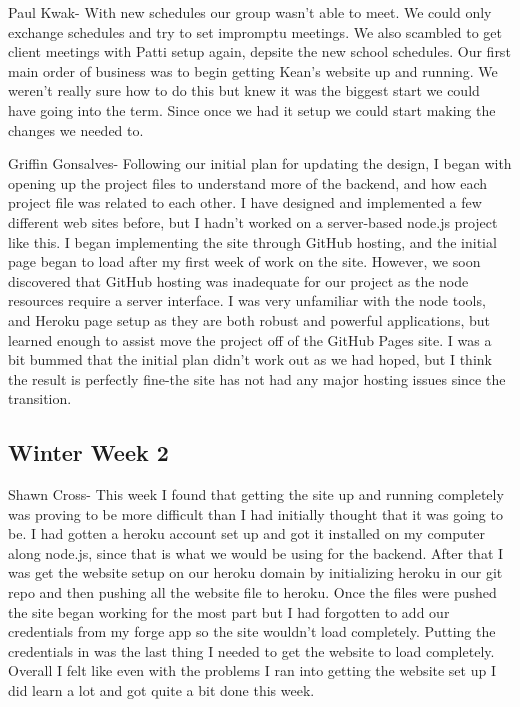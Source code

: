 \documentclass[10pt,draftclsnofoot,onecolumn]{IEEEtran}
\begin{document}
Paul Kwak- With new schedules our group wasn't able to meet. We could only exchange schedules and try to set impromptu meetings. We also scambled to get client meetings with Patti setup again, depsite the new school schedules. Our first main order of business was to begin getting Kean's website up and running. We weren't really sure how to do this but knew it was the biggest start we could have going into the term. Since once we had it setup we could start making the changes we needed to.

Griffin Gonsalves- Following our initial plan for updating the design, I began with opening up the project files to understand more of the backend, and how each project file was related to each other. I have designed and implemented a few different web sites before, but I hadn't worked on a server-based node.js project like this. I began implementing the site through GitHub hosting, and the initial page began to load after my first week of work on the site. However, we soon discovered that GitHub hosting was inadequate for our project as the node resources require a server interface. I was very unfamiliar with the node tools, and Heroku page setup as they are both robust and powerful applications, but learned enough to assist move the project off of the GitHub Pages site. I was a bit bummed that the initial plan didn't work out as we had hoped, but I think the result is perfectly fine-the site has not had any major hosting issues since the transition.

\subsection{Winter Week 2}
Shawn Cross- This week I found that getting the site up and running completely was proving to be more difficult than I had initially thought that it was going to be. I had gotten a heroku account set up and got it installed on my computer along node.js, since that is what we would be using for the backend. After that I was get the website setup on our heroku domain by initializing heroku in our git repo and then pushing all the website file to heroku. Once the files were pushed the site began working for the most part but I had forgotten to add our credentials from my forge app so the site wouldn't load completely. Putting the credentials in was the last thing I needed to get the website to load completely. Overall I felt like even with the problems I ran into getting the website set up I did learn a lot and got quite a bit done this week. 
\end{document}
